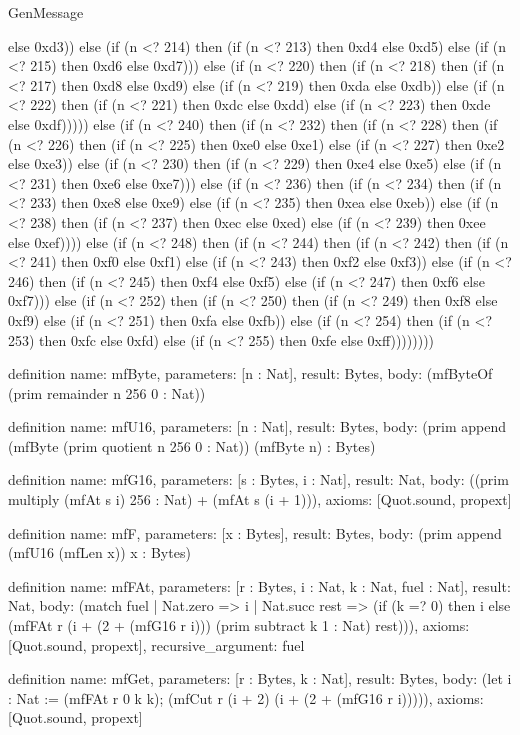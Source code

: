\begin{lexlean}{GenMessage}
\begin{semanticmodule}
{else 0xd3)) else (if (n <? 214) then (if (n <? 213) then 0xd4 else 0xd5) else (if (n <? 215) then 0xd6 else 0xd7))) else (if (n <? 220) then (if (n <? 218) then (if (n <? 217) then 0xd8 else 0xd9) else (if (n <? 219) then 0xda else 0xdb)) else (if (n <? 222) then (if (n <? 221) then 0xdc else 0xdd) else (if (n <? 223) then 0xde else 0xdf))))) else (if (n <? 240) then (if (n <? 232) then (if (n <? 228) then (if (n <? 226) then (if (n <? 225) then 0xe0 else 0xe1) else (if (n <? 227) then 0xe2 else 0xe3)) else (if (n <? 230) then (if (n <? 229) then 0xe4 else 0xe5) else (if (n <? 231) then 0xe6 else 0xe7))) else (if (n <? 236) then (if (n <? 234) then (if (n <? 233) then 0xe8 else 0xe9) else (if (n <? 235) then 0xea else 0xeb)) else (if (n <? 238) then (if (n <? 237) then 0xec else 0xed) else (if (n <? 239) then 0xee else 0xef)))) else (if (n <? 248) then (if (n <? 244) then (if (n <? 242) then (if (n <? 241) then 0xf0 else 0xf1) else (if (n <? 243) then 0xf2 else 0xf3)) else (if (n <? 246) then (if (n <? 245) then 0xf4 else 0xf5) else (if (n <? 247) then 0xf6 else 0xf7))) else (if (n <? 252) then (if (n <? 250) then (if (n <? 249) then 0xf8 else 0xf9) else (if (n <? 251) then 0xfa else 0xfb)) else (if (n <? 254) then (if (n <? 253) then 0xfc else 0xfd) else (if (n <? 255) then 0xfe else 0xff))))))))
}

definition{
  name: mfByte,
  parameters: [n : Nat],
  result: Bytes,
  body: (mfByteOf (prim remainder n 256 0 : Nat))
}

definition{
  name: mfU16,
  parameters: [n : Nat],
  result: Bytes,
  body: (prim append (mfByte (prim quotient n 256 0 : Nat)) (mfByte n) : Bytes)
}

definition{
  name: mfG16,
  parameters: [s : Bytes, i : Nat],
  result: Nat,
  body: ((prim multiply (mfAt s i) 256 : Nat) + (mfAt s (i + 1))),
  axioms: [Quot.sound, propext]
}

definition{
  name: mfF,
  parameters: [x : Bytes],
  result: Bytes,
  body: (prim append (mfU16 (mfLen x)) x : Bytes)
}

definition{
  name: mfFAt,
  parameters: [r : Bytes, i : Nat, k : Nat, fuel : Nat],
  result: Nat,
  body: (match fuel
    | Nat.zero => i
    | Nat.succ rest => (if (k =? 0) then i else (mfFAt r (i + (2 + (mfG16 r i))) (prim subtract k 1 : Nat) rest))),
  axioms: [Quot.sound, propext],
  recursive_argument: fuel
}

definition{
  name: mfGet,
  parameters: [r : Bytes, k : Nat],
  result: Bytes,
  body: (let i : Nat := (mfFAt r 0 k k); (mfCut r (i + 2) (i + (2 + (mfG16 r i))))),
  axioms: [Quot.sound, propext]
}


\end{semanticmodule}
\end{lexlean}
